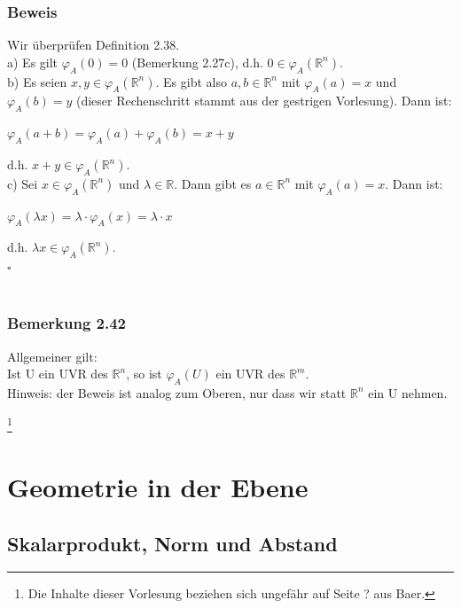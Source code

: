 \documentclass{article}
\begin{document}
\subsubsection*{Beweis}
Wir überprüfen Definition 2.38. \\
a) Es gilt $\varphi_A(0) = 0$ (Bemerkung 2.27c), d.h. $0 \in \varphi_A(\mathbb{R}^n)$. \\
b) Es seien $x,y \in \varphi_A(\mathbb{R}^n)$. Es gibt also $a,b \in \mathbb{R}^n$ mit $\varphi_A(a)=x$ und $\varphi_A(b)=y$ (dieser Rechenschritt stammt aus der gestrigen Vorlesung). Dann ist: \\
\begin{center}
    $\varphi_A(a+b) = \varphi_A(a) + \varphi_A(b) = x+y$ \\
\end{center}
d.h. $x+y \in \varphi_A(\mathbb{R}^n)$. \\
c) Sei $x \in \varphi_A(\mathbb{R}^n)$ und $\lambda \in \mathbb{R}$. Dann gibt es $a \in \mathbb{R}^n$ mit $\varphi_A(a)=x$. Dann ist: \\
\begin{center}
    $\varphi_A(\lambda x) = \lambda \cdot \varphi_A(x) = \lambda \cdot x$ \\
\end{center}
d.h. $\lambda x \in \varphi_A(\mathbb{R}^n)$. \\
$\square$ \\
\\
\subsubsection*{Bemerkung 2.42}
Allgemeiner gilt: \\
Ist U ein UVR des $\mathbb{R}^n$, so ist $\varphi_A(U)$ ein UVR des $\mathbb{R}^m$. \\
Hinweis: der Beweis ist analog zum Oberen, nur dass wir statt $\mathbb{R}^n$ ein U nehmen. \\

\newpage
\date{Mittwoch, 29.11.23} \footnote[1]{Die Inhalte dieser Vorlesung beziehen sich ungefähr auf Seite ? aus Baer.}

\section{Geometrie in der Ebene}
\subsection{Skalarprodukt, Norm und Abstand}
\end{document}
